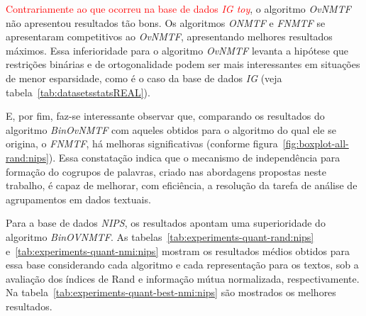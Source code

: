 \documentclass[
    12pt,                %
    oneside,            %
    a4paper,            %
    english,            %
    brazil                %
    ]{abntex2ppgsi}
\begin{document}

\textcolor{red}{Contrariamente ao que ocorreu na base de dados \textit{IG toy}}, o algoritmo \textit{OvNMTF} não apresentou resultados tão bons. Os algoritmos \textit{ONMTF} e \textit{FNMTF} se apresentaram competitivos ao \textit{OvNMTF}, apresentando melhores resultados máximos. Essa inferioridade para o algoritmo \textit{OvNMTF} levanta a hipótese que restrições binárias e de ortogonalidade podem ser mais interessantes em situações de menor esparsidade, como é o caso da base de dados \textit{IG} (veja tabela~\ref{tab:datasetsstatsREAL}).

E, por fim, faz-se interessante observar que, comparando os resultados do algoritmo \textit{BinOvNMTF} com aqueles obtidos para o algoritmo do qual ele se origina, o \textit{FNMTF}, há melhoras significativas (conforme figura~\ref{fig:boxplot-all-rand:nips}). Essa constatação indica que o mecanismo de independência para formação do cogrupos de palavras, criado nas abordagens propostas neste trabalho, é capaz de melhorar, com eficiência, a resolução da tarefa de análise de agrupamentos em dados textuais.




Para a base de dados \textit{NIPS}, os resultados apontam uma superioridade do algoritmo \textit{BinOVNMTF}. As tabelas~\ref{tab:experiments-quant-rand:nips} e~\ref{tab:experiments-quant-nmi:nips} mostram os resultados médios obtidos para essa base considerando cada algoritmo e cada representação para os textos, sob a avaliação dos índices de Rand e informação mútua normalizada, respectivamente. Na tabela~\ref{tab:experiments-quant-best-nmi:nips} são mostrados os melhores resultados.
\end{document}
